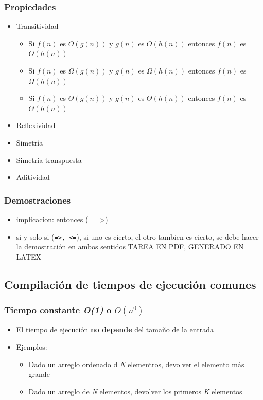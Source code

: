 \documentclass[letterpaper]{article}
\begin{document}
\subsubsection{Propiedades}
\label{sec:orgb6c353f}
\begin{itemize}
\item Transitividad
\begin{itemize}
\item Si \(f(n)\) es \(O(g(n))\) y \(g(n)\) es \(O(h(n))\) entonces \(f(n)\) es \(O(h(n))\)
\item Si \(f(n)\) es \(\Omega(g(n))\) y \(g(n)\) es \(\Omega(h(n))\) entonces \(f(n)\) es
\(\Omega(h(n))\)
\item Si \(f(n)\) es \(\Theta(g(n))\) y \(g(n)\) es \(\Theta(h(n))\) entonces \(f(n)\) es
\(\Theta(h(n))\)
\end{itemize}
\item Reflexividad
\item Simetría
\item Simetría transpuesta
\item Aditividad
\end{itemize}

\subsubsection{Demostraciones}
\label{sec:org72d6aa2}
\begin{itemize}
\item implicacion: entonces (==>)
\item si y solo si (\texttt{=>, <=}), si uno es cierto, el otro tambien es cierto, se debe
hacer la demostración en ambos sentidos
TAREA EN PDF, GENERADO EN LATEX
\end{itemize}
\subsection{Compilación de tiempos de ejecución comunes}
\label{sec:orgcec5d15}
\subsubsection{Tiempo constante \emph{O(1)} o \(O(n^0)\)}
\label{sec:org29411cd}
\begin{itemize}
\item El tiempo de ejecución \textbf{no depende} del tamaño de la entrada
\item Ejemplos:
\begin{itemize}
\item Dado un arreglo ordenado d \emph{N} elementros, devolver el elemento más grande
\item Dado un arreglo de \emph{N} elementos, devolver los primeros \emph{K} elementos
\end{itemize}
\end{itemize}
\end{document}
